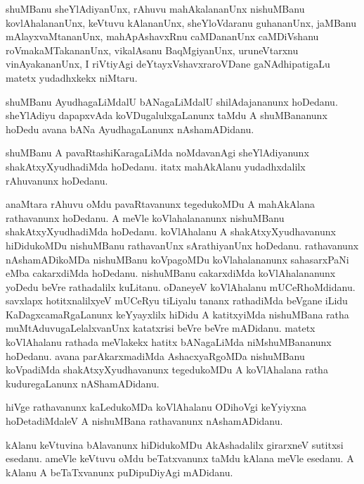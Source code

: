 \documentclass{article}
\begin{document}
\begin{mn}%
shuMBanu sheYlAdiyanUnx, rAhuvu mahAkalananUnx nishuMBanu kovlAhalananUnx, keVtuvu 
kAlananUnx, sheYloVdaranu guhananUnx, jaMBanu mAlayxvaMtananUnx, mahApAshavxRnu caMDananUnx 
caMDiVshanu roVmakaMTakananUnx, vikalAsanu BaqMgiyanUnx, uruneVtarxnu vinAyakananUnx, I 
riVtiyAgi deYtayxVshavxraroVDane gaNAdhipatigaLu matetx yudadhxkekx niMtaru.
\end{mn}

\begin{mn}%
shuMBanu AyudhagaLiMdalU bANagaLiMdalU shilAdajananunx hoDedanu. sheYlAdiyu dapapxvAda 
koVDugalulxgaLanunx taMdu A shuMBananunx hoDedu avana bANa AyudhagaLanunx nAshamADidanu.
\end{mn}

\begin{mn}%
shuMBanu A pavaRtashiKaragaLiMda noMdavanAgi sheYlAdiyanunx shakAtxyXyudhadiMda hoDedanu. 
itatx mahAkAlanu yudadhxdalilx rAhuvanunx hoDedanu.
\end{mn}

\begin{mn}%
anaMtara rAhuvu oMdu pavaRtavanunx tegedukoMDu A mahAkAlana rathavanunx hoDedanu. A meVle 
koVlahalananunx nishuMBanu shakAtxyXyudhadiMda hoDedanu. koVlAhalanu A shakAtxyXyudhavanunx 
hiDidukoMDu nishuMBanu rathavanUnx sArathiyanUnx hoDedanu. rathavanunx nAshamADikoMDa 
nishuMBanu koVpagoMDu koVlahalananunx sahasarxPaNi eMba cakarxdiMda hoDedanu. nishuMBanu 
cakarxdiMda koVlAhalananunx yoDedu beVre rathadalilx kuLitanu. oDaneyeV koVlAhalanu 
mUCeRhoMdidanu. savxlapx hotitxnalilxyeV mUCeRyu tiLiyalu tananx rathadiMda beVgane iLidu 
KaDagxcamaRgaLanunx keYyayxlilx hiDidu A katitxyiMda nishuMBana ratha 
muMtAduvugaLelalxvanUnx katatxrisi beVre beVre mADidanu. matetx koVlAhalanu rathada 
meVlakekx hatitx bANagaLiMda niMshuMBananunx hoDedanu. avana parAkarxmadiMda AshacxyaRgoMDa 
nishuMBanu koVpadiMda shakAtxyXyudhavanunx tegedukoMDu A koVlAhalana ratha kuduregaLanunx 
nAShamADidanu.	
\end{mn}

\begin{mn}%
hiVge rathavanunx kaLedukoMDa koVlAhalanu ODihoVgi keYyiyxna hoDetadiMdaleV A nishuMBana 
rathavanunx nAshamADidanu.
\end{mn}

\begin{mn}%
kAlanu keVtuvina bAlavanunx hiDidukoMDu AkAshadalilx girarxneV sutitxsi esedanu. ameVle 
keVtuvu oMdu beTatxvanunx taMdu kAlana meVle esedanu. A kAlanu A beTaTxvanunx puDipuDiyAgi 
mADidanu.
\end{mn}
\end{document}
